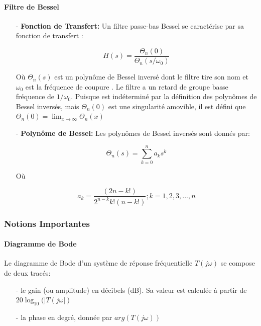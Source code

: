 \documentclass[conference,onecolumn]{IEEEtran}
\begin{document}
\paragraph{Filtre de Bessel}
\hfill
\medskip
\begin{itemize}
    \item[-] \textbf{Fonction de Transfert:}
    Un filtre passe-bas Bessel se caractérise par sa fonction de transfert :

        \begin{equation}
            H(s) = \frac{\Theta_n(0)}{\Theta_n(s/\omega_0)}
        \end{equation}

    Où $\Theta_n(s)$ est un polynôme de Bessel inversé dont le filtre tire son nom et $\omega_0$ est  la fréquence de coupure . Le filtre a un retard de groupe basse fréquence de $1/\omega_0$. Puisque est indéterminé par la définition des polynômes de Bessel inversés, mais $\Theta_n(0)$ est une singularité amovible, il est défini que $\Theta_n(0) =  \lim_{x\to\infty} \Theta_n(x)$

    \item[-] \textbf{Polynôme de Bessel:}
        Les polynômes de Bessel inversés sont donnés par: 

        \begin{equation}
            \Theta_n(s) =  \sum_{k=0}^{n} a_k s^k 
        \end{equation}

        Où

        \begin{equation}
            a_k = \frac{(2n - k!)}{2^{n-k} k!(n-k!)}; k = 1,2,3, ...,n
        \end{equation}
\end{itemize}

\subsubsection{Notions Importantes}
\paragraph{Diagramme de Bode}
Le diagramme de Bode d'un système de réponse fréquentielle $T(j\omega)$ se compose de deux tracés:

\begin{itemize}
    \item[-] le gain (ou amplitude) en décibels (dB). Sa valeur est calculée à partir de $20\log_{10}(|T(j\omega|)$

    \item[-] la phase en degré, donnée par $arg(T(j\omega))$
\end{itemize}
\end{document}
